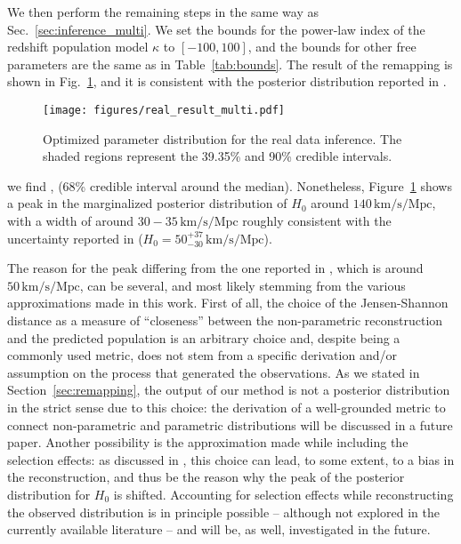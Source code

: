 \documentclass[sn-aps, pdflatex, iicol]{sn-jnl}
\begin{document}
We then perform the remaining steps in the same way as Sec.~\ref{sec:inference_multi}.
We set the bounds for the power-law index of the redshift population model $\kappa$ to $[-100, 100]$, and the bounds for other free parameters are the same as in Table~\ref{tab:bounds}.
The result of the remapping is shown in Fig.~\ref{fig:real_result_multi}, and it is consistent with the posterior distribution reported in \cite{LIGOScientific:2021aug}.
\begin{figure}
    \texttt{[image: figures/real\_result\_multi.pdf]}
    \caption{
        Optimized parameter distribution for the real data inference.
        The shaded regions represent the 39.35\% and 90\% credible intervals.
    }
    \label{fig:real_result_multi}
\end{figure}
we find , (68\% credible interval around the median). Nonetheless, Figure~\ref{fig:real_result_multi} shows a peak in the marginalized posterior distribution of $H_0$ around $140\, \mathrm{km/s/Mpc}$, with a width of around $30-35\, \mathrm{km/s/Mpc}$ roughly consistent with the uncertainty reported in \cite{LIGOScientific:2021aug} ($H_0 = 50^{+37}_{-30} \, \mathrm{km/s/Mpc}$).

The reason for the peak differing from the one reported in \cite{LIGOScientific:2021aug}, which is around $50\, \mathrm{km/s/Mpc}$, can be several, and most likely stemming from the various approximations made in this work. First of all, the choice of the Jensen-Shannon distance as a measure of ``closeness'' between the non-parametric reconstruction and the predicted population is an arbitrary choice and, despite being a commonly used metric, does not stem from a specific derivation and/or assumption on the process that generated the observations. As we stated in Section~\ref{sec:remapping}, the output of our method is not a posterior distribution in the strict sense due to this choice: the derivation of a well-grounded metric to connect non-parametric and parametric distributions will be discussed in a future paper. Another possibility is the approximation made while including the selection effects: as discussed in \cite{Essick:2023upv}, this choice can lead, to some extent, to a bias in the reconstruction, and thus be the reason why the peak of the posterior distribution for $H_0$ is shifted. Accounting for selection effects while reconstructing the observed distribution is in principle possible -- although not explored in the currently available literature -- and will be, as well, investigated in the future.
\end{document}
